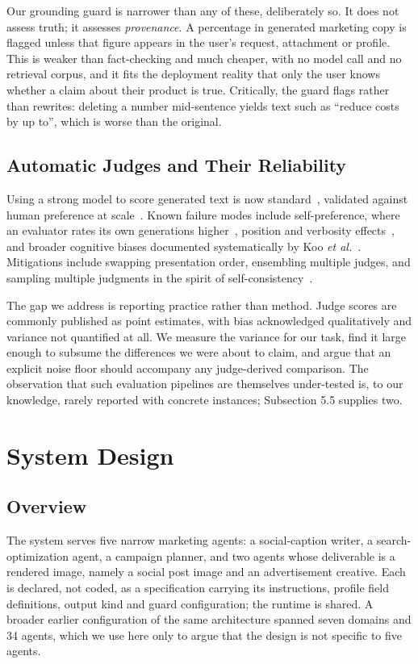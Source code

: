 \documentclass[9pt,twocolumn]{extarticle}
\begin{document}
Our grounding guard is narrower than any of these, deliberately so. It does not
assess truth; it assesses \textit{provenance}. A percentage in generated
marketing copy is flagged unless that figure appears in the user's request,
attachment or profile. This is weaker than fact-checking and much cheaper, with
no model call and no retrieval corpus, and it fits the deployment reality that
only the user knows whether a claim about their product is true. Critically,
the guard flags rather than rewrites: deleting a number mid-sentence yields
text such as ``reduce costs by up to'', which is worse than the original.

\subsection{Automatic Judges and Their Reliability}
Using a strong model to score generated text is now
standard~\cite{zheng2023judging, liu2023geval}, validated against human
preference at scale~\cite{chiang2024arena}. Known failure modes include
self-preference, where an evaluator rates its own
generations higher~\cite{panickssery2024selfpref}, position and verbosity
effects~\cite{wang2023fair}, and broader cognitive biases documented
systematically by Koo \textit{et al.}~\cite{koo2023benchmarking}. Mitigations
include swapping presentation order, ensembling multiple judges, and sampling
multiple judgments in the spirit of
self-consistency~\cite{wang2023selfconsistency}.

The gap we address is reporting practice rather than method. Judge scores are
commonly published as point estimates, with bias acknowledged qualitatively and
variance not quantified at all. We measure the variance for our task, find it
large enough to subsume the differences we were about to claim, and argue that
an explicit noise floor should accompany any judge-derived comparison. The
observation that such evaluation pipelines are themselves under-tested is, to
our knowledge, rarely reported with concrete instances; Subsection 5.5 supplies
two.

\section{System Design}

\subsection{Overview}
The system serves five narrow marketing agents: a social-caption writer, a
search-optimization agent, a campaign planner, and two agents whose deliverable
is a rendered image, namely a social post image and an advertisement creative.
Each is declared, not coded, as a specification carrying its instructions,
profile field definitions, output kind and guard configuration; the runtime is
shared. A broader earlier configuration of the same architecture spanned seven
domains and 34 agents, which we use here only to argue that the design is not
specific to five agents.
\end{document}
